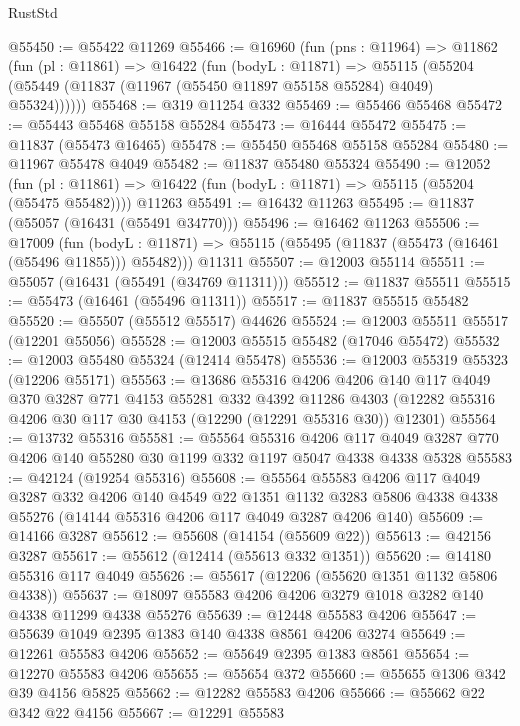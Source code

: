 \begin{lexlean}{RustStd}
\begin{coremodule}
{\begin{coremodule}
{{{{{{{{{{{{{{{{{{{{{{{{{{{{{{{{{{{{{{{{{{{{{{{{{{@55450 := @55422 @11269
@55466 := @16960
    (fun (pns : @11964) =>
    @11862
      (fun (pl : @11861) =>
      @16422
        (fun (bodyL : @11871) =>
        @55115 (@55204 (@55449 (@11837 (@11967 (@55450 @11897 @55158 @55284) @4049) @55324))))))
@55468 := @319 @11254 @332
@55469 := @55466 @55468
@55472 := @55443 @55468 @55158 @55284
@55473 := @16444 @55472
@55475 := @11837 (@55473 @16465)
@55478 := @55450 @55468 @55158 @55284
@55480 := @11967 @55478 @4049
@55482 := @11837 @55480 @55324
@55490 := @12052
    (fun (pl : @11861) => @16422 (fun (bodyL : @11871) => @55115 (@55204 (@55475 @55482))))
    @11263
@55491 := @16432 @11263
@55495 := @11837 (@55057 (@16431 (@55491 @34770)))
@55496 := @16462 @11263
@55506 := @17009
    (fun (bodyL : @11871) => @55115 (@55495 (@11837 (@55473 (@16461 (@55496 @11855))) @55482)))
    @11311
@55507 := @12003 @55114
@55511 := @55057 (@16431 (@55491 (@34769 @11311)))
@55512 := @11837 @55511
@55515 := @55473 (@16461 (@55496 @11311))
@55517 := @11837 @55515 @55482
@55520 := @55507 (@55512 @55517) @44626
@55524 := @12003 @55511 @55517 (@12201 @55056)
@55528 := @12003 @55515 @55482 (@17046 @55472)
@55532 := @12003 @55480 @55324 (@12414 @55478)
@55536 := @12003 @55319 @55323 (@12206 @55171)
@55563 := @13686
    @55316
    @4206
    @4206
    @140
    @117
    @4049
    @370
    @3287
    @771
    @4153
    @55281
    @332
    @4392
    @11286
    @4303
    (@12282 @55316 @4206 @30 @117 @30 @4153 (@12290 (@12291 @55316 @30)) @12301)
@55564 := @13732 @55316
@55581 := @55564
    @55316
    @4206
    @117
    @4049
    @3287
    @770
    @4206
    @140
    @55280
    @30
    @1199
    @332
    @1197
    @5047
    @4338
    @4338
    @5328
@55583 := @42124 (@19254 @55316)
@55608 := @55564
    @55583
    @4206
    @117
    @4049
    @3287
    @332
    @4206
    @140
    @4549
    @22
    @1351
    @1132
    @3283
    @5806
    @4338
    @4338
    @55276
    (@14144 @55316 @4206 @117 @4049 @3287 @4206 @140)
@55609 := @14166 @3287
@55612 := @55608 (@14154 (@55609 @22))
@55613 := @42156 @3287
@55617 := @55612 (@12414 (@55613 @332 @1351))
@55620 := @14180 @55316 @117 @4049
@55626 := @55617 (@12206 (@55620 @1351 @1132 @5806 @4338))
@55637 := @18097 @55583 @4206 @4206 @3279 @1018 @3282 @140 @4338 @11299 @4338 @55276
@55639 := @12448 @55583 @4206
@55647 := @55639 @1049 @2395 @1383 @140 @4338 @8561 @4206 @3274
@55649 := @12261 @55583 @4206
@55652 := @55649 @2395 @1383 @8561
@55654 := @12270 @55583 @4206
@55655 := @55654 @372
@55660 := @55655 @1306 @342 @39 @4156 @5825
@55662 := @12282 @55583 @4206
@55666 := @55662 @22 @342 @22 @4156
@55667 := @12291 @55583
}}}}}}}}}}}}}}}}}}}}}}}}}}}}}}}}}}}}}}}}}}}}}}}}}}
\end{coremodule}}
\end{coremodule}
\end{lexlean}
